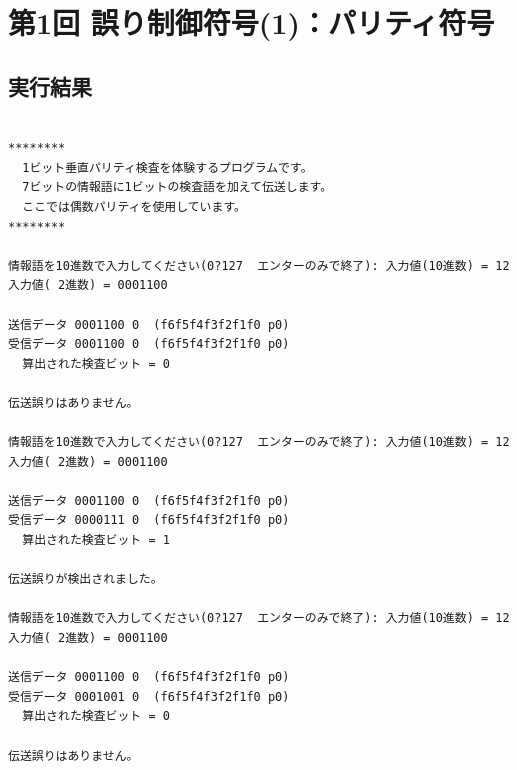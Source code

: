 \documentclass[a4j]{celb-report}
\begin{document}

\section{第1回 誤り制御符号(1)：パリティ符号}

\subsection{実行結果}

%
\begin{lstlisting}[basicstyle=\ttfamily\footnotesize, frame=single]

********
  1ビット垂直パリティ検査を体験するプログラムです。
  7ビットの情報語に1ビットの検査語を加えて伝送します。
  ここでは偶数パリティを使用しています。
********

情報語を10進数で入力してください(0?127  エンターのみで終了): 入力値(10進数) = 12
入力値( 2進数) = 0001100

送信データ 0001100 0  (f6f5f4f3f2f1f0 p0)
受信データ 0001100 0  (f6f5f4f3f2f1f0 p0)
  算出された検査ビット = 0

伝送誤りはありません。

情報語を10進数で入力してください(0?127  エンターのみで終了): 入力値(10進数) = 12
入力値( 2進数) = 0001100

送信データ 0001100 0  (f6f5f4f3f2f1f0 p0)
受信データ 0000111 0  (f6f5f4f3f2f1f0 p0)
  算出された検査ビット = 1

伝送誤りが検出されました。

情報語を10進数で入力してください(0?127  エンターのみで終了): 入力値(10進数) = 12
入力値( 2進数) = 0001100

送信データ 0001100 0  (f6f5f4f3f2f1f0 p0)
受信データ 0001001 0  (f6f5f4f3f2f1f0 p0)
  算出された検査ビット = 0

伝送誤りはありません。

\end{lstlisting}
%
\end{document}
